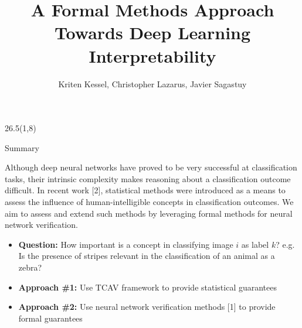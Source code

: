 \documentclass[final]{beamer}
\title{A Formal Methods Approach Towards Deep Learning Interpretability}
\author{Kriten Kessel, Christopher Lazarus, Javier Sagastuy}
\institute{Stanford University}
\begin{document}
\newcommand{\vltbl}{{\color{tbllinecolor}\vrule}}


\begin{frame}[fragile]{}

%

\newcommand{\vstart}{58} %
\newcommand{\vstartCols}{8} %
\newcommand{\fullwidth}{81}  %
\newcommand{\colwidth}{26.5}

\newcommand{\firstcolpos}{1}
\newcommand{\secondcolpos}{28.75}
\newcommand{\thirdcolpos}{56.5}
\newcommand{\bottomblockstart}{108.5}


\newenvironment{paddedBlock}[2][0.95\linewidth]
    {\begin{block}{#2}\begin{minipage}{#1}}
    {\end{minipage}\end{block}}


\begin{textblock}{\colwidth}(\firstcolpos,\vstartCols)

\begin{paddedBlock}{Summary}
Although deep neural networks have proved to be very successful at classification tasks, their intrinsic complexity makes reasoning about a classification outcome difficult.
In recent work [2], statistical methods were introduced as a means to assess the influence of human-intelligible concepts in classification outcomes.
We aim to assess and extend such methods by leveraging formal methods for neural network verification.
\begin{itemize}
\item \textbf{Question:} How important is a concept in classifying image $i$ as label $k$? e.g. Is the presence of stripes relevant in the classification of an animal as a zebra?
\item \textbf{Approach \#1:} Use TCAV framework to provide statistical guarantees
\item \textbf{Approach \#2:} Use neural network verification methods [1] to provide formal guarantees
\end{itemize}
\end{paddedBlock}


\end{textblock}
\end{frame}
\end{document}
